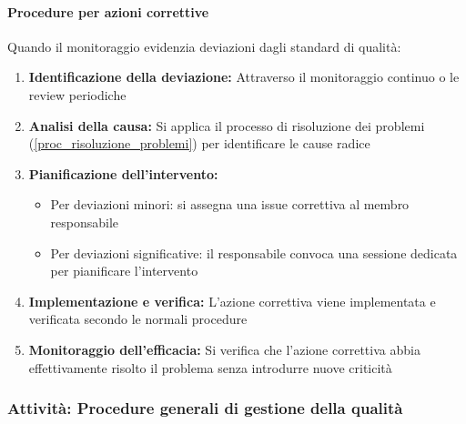 \documentclass[a4paper,12pt]{article}
\begin{document}
\paragraph{Procedure per azioni correttive}
Quando il monitoraggio evidenzia deviazioni dagli standard di qualità:
\begin{enumerate}
    \item \textbf{Identificazione della deviazione:} Attraverso il monitoraggio continuo o le review periodiche
    \item \textbf{Analisi della causa:} Si applica il processo di risoluzione dei problemi (\ref{proc_risoluzione_problemi}) per identificare le cause radice
    \item \textbf{Pianificazione dell'intervento:}
    \begin{itemize}
        \item Per deviazioni minori: si assegna una issue correttiva al membro responsabile
        \item Per deviazioni significative: il responsabile convoca una sessione dedicata per pianificare l'intervento
    \end{itemize}
    \item \textbf{Implementazione e verifica:} L'azione correttiva viene implementata e verificata secondo le normali procedure
    \item \textbf{Monitoraggio dell'efficacia:} Si verifica che l'azione correttiva abbia effettivamente risolto il problema senza introdurre nuove criticità
\end{enumerate}

\subsubsection{Attività: Procedure generali di gestione della qualità}\label{procedure_gestione_qualita}
\end{document}
